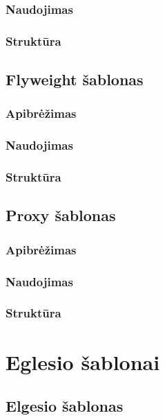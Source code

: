 \documentclass[10pt]{IEEEtran}
\begin{document}
			\subsubsection{Naudojimas}

			\subsubsection{Struktūra}

		\subsection{Flyweight šablonas}

			\subsubsection{Apibrėžimas}

			\subsubsection{Naudojimas}

			\subsubsection{Struktūra}

		\subsection{Proxy šablonas}

			\subsubsection{Apibrėžimas}

			\subsubsection{Naudojimas}

			\subsubsection{Struktūra}
		
	\section{Eglesio šablonai}

		\subsection{Elgesio šablonas}
\end{document}
